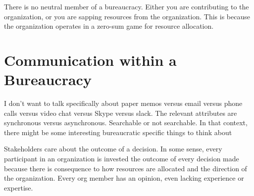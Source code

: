 \documentclass{book}
\begin{document}
    There is no neutral member of a bureaucracy. Either you are contributing to the organization, or you are sapping resources from the organization. This is because the organization operates in a zero-sum game for resource allocation.
    
    
    
    
  \newpage
    
    
    
    
        
  
  \newpage
  
    
    
    
  \newpage
  \section{Communication within a Bureaucracy}
  I don't want to talk specifically about paper memos versus email versus phone calls versus video chat versus Skype versus slack. 
The relevant attributes are synchronous versus asynchronous. Searchable or not searchable. In that context, there might be some interesting bureaucratic specific things to think about
    
%    
    
%    
    

    Stakeholders care about the outcome of a decision. 
    In some sense, every participant in an organization is invested the outcome of every decision made because there is consequence to how resources are allocated and the direction of the organization. Every org member has an opinion, even lacking experience or expertise. 
    
    
    
%    
%    
    
\end{document}
